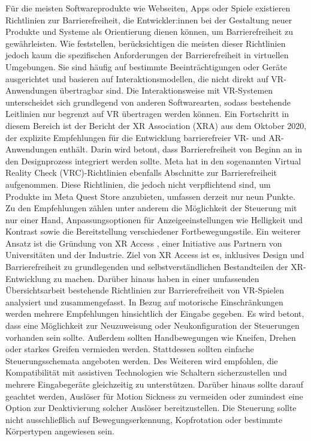 Für die meisten Softwareprodukte wie Webseiten, Apps oder Spiele existieren Richtlinien zur Barrierefreiheit, die Entwickler:innen bei der Gestaltung neuer Produkte und Systeme als Orientierung dienen können, um Barrierefreiheit zu gewährleisten. Wie \citet{heilemann_accessibility_2021} feststellen, berücksichtigen die meisten dieser Richtlinien jedoch kaum die spezifischen Anforderungen der Barrierefreiheit in virtuellen Umgebungen. Sie sind häufig auf bestimmte Beeinträchtigungen oder Geräte ausgerichtet und basieren auf Interaktionsmodellen, die nicht direkt auf VR-Anwendungen übertragbar sind. Die Interaktionsweise mit VR-Systemen unterscheidet sich grundlegend von anderen Softwarearten, sodass bestehende Leitlinien nur begrenzt auf VR übertragen werden können. Ein Fortschritt in diesem Bereich ist der Bericht der XR Association (XRA) aus dem Oktober 2020, der explizite Empfehlungen für die Entwicklung barrierefreier VR- und AR-Anwendungen enthält. Darin wird betont, dass Barrierefreiheit von Beginn an in den Designprozess integriert werden sollte. Meta hat in den sogenannten Virtual Reality Check (VRC)-Richtlinien \citep{meta_meta_2024} ebenfalls Abschnitte zur Barrierefreiheit aufgenommen. Diese Richtlinien, die jedoch nicht verpflichtend sind, um Produkte im Meta Quest Store anzubieten, umfassen derzeit nur neun Punkte. Zu den Empfehlungen zählen unter anderem die Möglichkeit der Steuerung mit nur einer Hand, Anpassungsoptionen für Anzeigeeinstellungen wie Helligkeit und Kontrast sowie die Bereitstellung verschiedener Fortbewegungsstile. Ein weiterer Ansatz ist die Gründung von XR Access \citep{xr_access_-_virtual_augmented__mixed_reality_for_people_with_disabilities_xr_2024}, einer Initiative aus Partnern von Universitäten und der Industrie. Ziel von XR Access ist es, inklusives Design und Barrierefreiheit zu grundlegenden und selbstverständlichen Bestandteilen der XR-Entwicklung zu machen. Darüber hinaus haben \citet{heilemann_accessibility_2021} in einer umfassenden Übersichtsarbeit bestehende Richtlinien zur Barrierefreiheit von VR-Spielen analysiert und zusammengefasst. In Bezug auf motorische Einschränkungen werden mehrere Empfehlungen hinsichtlich der Eingabe gegeben. Es wird betont, dass eine Möglichkeit zur Neuzuweisung oder Neukonfiguration der Steuerungen vorhanden sein sollte. Außerdem sollten Handbewegungen wie Kneifen, Drehen oder starkes Greifen vermieden werden. Stattdessen sollten einfache Steuerungsschemata angeboten werden. Des Weiteren wird empfohlen, die Kompatibilität mit assistiven Technologien wie Schaltern sicherzustellen und mehrere Eingabegeräte gleichzeitig zu unterstützen. Darüber hinaus sollte darauf geachtet werden, Auslöser für Motion Sickness zu vermeiden oder zumindest eine Option zur Deaktivierung solcher Auslöser bereitzustellen. Die Steuerung sollte nicht ausschließlich auf Bewegungserkennung, Kopfrotation oder bestimmte Körpertypen angewiesen sein.

